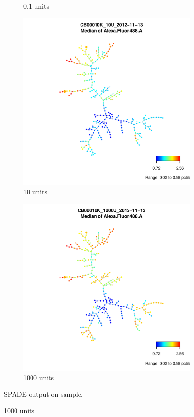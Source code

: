 \begin{figure}[h]
\begin{subfigure}[b]{.4\textwidth}
  \caption{0.1 units}
\end{subfigure}
\begin{subfigure}[b]{.4\textwidth}
  \includegraphics[scale=.4]{IL2/figures/CB00010K-10U-2012-11-13-spade.pdf}
  \caption{10 units}
\end{subfigure}
\begin{subfigure}[b]{.4\textwidth}
  \includegraphics[scale=.4]{IL2/figures/CB00010K-1000U-2012-11-13-spade.pdf}
  \caption{1000 units}
\end{subfigure}
    {SPADE output on sample.}
    {
    }
\end{figure}

